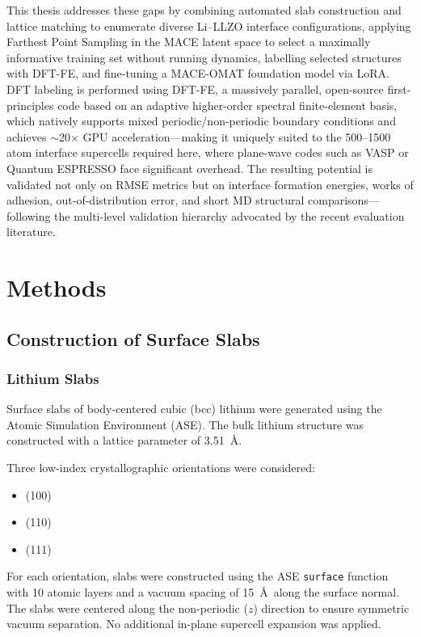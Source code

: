 \documentclass[12pt,a4paper,oneside]{book}
\begin{document}
This thesis addresses these gaps by combining automated slab construction and lattice matching to enumerate diverse Li--LLZO interface configurations, applying Farthest Point Sampling in the MACE latent space to select a maximally informative training set without running dynamics, labelling selected structures with DFT-FE, and fine-tuning a MACE-OMAT foundation model via LoRA. DFT labeling is performed using DFT-FE, a massively parallel, open-source first-principles code based on an adaptive higher-order spectral finite-element basis, which natively supports mixed periodic/non-periodic boundary conditions and achieves $\sim$20$\times$ GPU acceleration---making it uniquely suited to the 500--1500 atom interface supercells required here, where plane-wave codes such as VASP or Quantum ESPRESSO face significant overhead. The resulting potential is validated not only on RMSE metrics but on interface formation energies, works of adhesion, out-of-distribution error, and short MD structural comparisons---following the multi-level validation hierarchy advocated by the recent evaluation literature.

\chapter{Methods}
\label{ch:methods}
\section{Construction of Surface Slabs}

\subsection{Lithium Slabs}

Surface slabs of body-centered cubic (bcc) lithium were generated using the
Atomic Simulation Environment (ASE). The bulk lithium structure was constructed
with a lattice parameter of 3.51~\AA.

Three low-index crystallographic orientations were considered:
\begin{itemize}
    \item (100)
    \item (110)
    \item (111)
\end{itemize}

For each orientation, slabs were constructed using the ASE \texttt{surface}
function with 10 atomic layers and a vacuum spacing of 15~\AA\ along the surface
normal. The slabs were centered along the non-periodic ($z$) direction to ensure
symmetric vacuum separation. No additional in-plane supercell expansion was applied.
\end{document}
